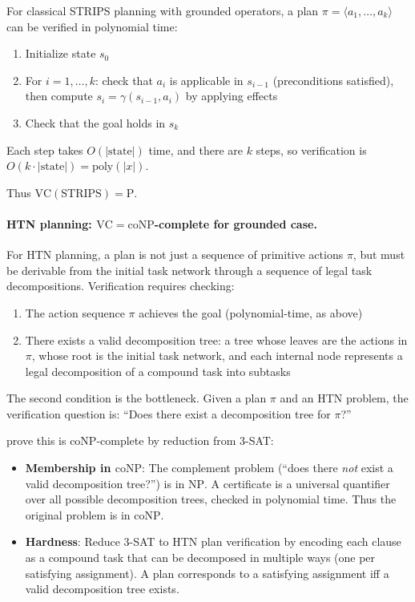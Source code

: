 \documentclass{article}
\theoremstyle{definition}
\theoremstyle{remark}
\newcommand{\PTIME}{\mathrm{P}}
\newcommand{\NP}{\mathrm{NP}}
\newcommand{\coNP}{\mathrm{coNP}}
\newcommand{\VC}{\mathrm{VC}}           %
\newcommand{\poly}{\mathrm{poly}}
\begin{document}
For classical STRIPS planning with grounded operators, a plan $\pi = \langle a_1, \ldots, a_k \rangle$ can be verified in polynomial time:
\begin{enumerate}[label=(\roman*)]
    \item Initialize state $s_0$
    \item For $i = 1, \ldots, k$: check that $a_i$ is applicable in $s_{i-1}$ (preconditions satisfied), then compute $s_i = \gamma(s_{i-1}, a_i)$ by applying effects
    \item Check that the goal holds in $s_k$
\end{enumerate}
Each step takes $O(|\text{state}|)$ time, and there are $k$ steps, so verification is $O(k \cdot |\text{state}|) = \poly(|x|)$.

Thus $\VC(\text{STRIPS}) = \PTIME$.

\paragraph{HTN planning: $\VC = \coNP$-complete for grounded case.}

For HTN planning, a plan is not just a sequence of primitive actions $\pi$, but must be derivable from the initial task network through a sequence of legal task decompositions. Verification requires checking:
\begin{enumerate}[label=(\roman*)]
    \item The action sequence $\pi$ achieves the goal (polynomial-time, as above)
    \item There exists a valid decomposition tree: a tree whose leaves are the actions in $\pi$, whose root is the initial task network, and each internal node represents a legal decomposition of a compound task into subtasks
\end{enumerate}

The second condition is the bottleneck. Given a plan $\pi$ and an HTN problem, the verification question is: ``Does there exist a decomposition tree for $\pi$?''

\citet{behnke2024verification} prove this is $\coNP$-complete by reduction from 3-SAT:
\begin{itemize}
    \item \textbf{Membership in $\coNP$}: The complement problem (``does there \emph{not} exist a valid decomposition tree?'') is in $\NP$. A certificate is a universal quantifier over all possible decomposition trees, checked in polynomial time. Thus the original problem is in $\coNP$.
    \item \textbf{Hardness}: Reduce 3-SAT to HTN plan verification by encoding each clause as a compound task that can be decomposed in multiple ways (one per satisfying assignment). A plan corresponds to a satisfying assignment iff a valid decomposition tree exists.
\end{itemize}
\end{document}
